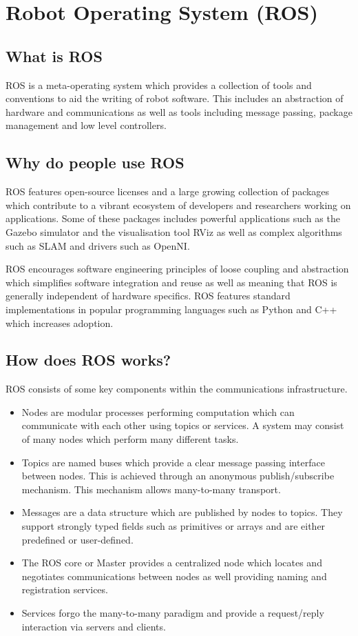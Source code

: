 \documentclass{mproj}
\begin{document}
\section{Robot Operating System (ROS)}
\subsection{What is ROS}

ROS is a meta-operating system which provides a collection of tools and conventions to aid the writing of robot software. This includes an abstraction of hardware and communications as well as tools including message passing, package management and low level controllers.

\subsection{Why do people use ROS}

ROS features open-source licenses and a large growing collection of packages which contribute to a vibrant ecosystem of developers and researchers working on applications. Some of these packages includes powerful applications such as the Gazebo simulator and the visualisation tool RViz as well as complex algorithms such as SLAM and drivers such as OpenNI.

ROS encourages software engineering principles of loose coupling and abstraction which simplifies software integration and reuse as well as meaning that ROS is generally independent of hardware specifics. ROS features standard implementations in popular programming languages such as Python and C++ which increases adoption.

\subsection{How does ROS works?}

ROS consists of some key components within the communications infrastructure.
\begin{itemize}
  \item Nodes are modular processes performing computation which can communicate with each other using topics or services. A system may consist of many nodes which perform many different tasks.
  \item Topics are named buses which provide a clear message passing interface between nodes. This is achieved through an anonymous publish/subscribe mechanism. This mechanism allows many-to-many transport.
  \item Messages are a data structure which are published by nodes to topics. They support strongly typed fields such as primitives or arrays and are either predefined or user-defined.
  \item The ROS core or Master provides a centralized node which locates and negotiates communications between nodes as well providing naming and registration services.
  \item Services forgo the many-to-many paradigm and provide a request/reply interaction via servers and clients.

\end{itemize}
\end{document}
